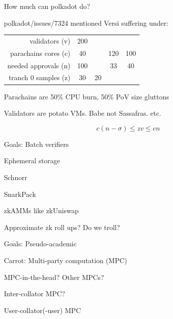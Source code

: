 \documentclass{beamer}
\begin{document}
\begin{frame}{How much can polkadot do?}

polkadot/issues/7324 mentioned Versi suffering under: \\ \medskip

\begin{tabular}{r c c c c}
validators (v)       & 200 & & \\
parachains cores (c) & 40  & & 120 & 100 \\
needed approvals (n) & 100 & & 33 & 40 \\
tranch 0 samples (z) & 30  & 20 & \\ %
\end{tabular}

\medskip 

Parachains are 50\% CPU burn, 50\% PoV size gluttons
 
Validators are potato VMs.  Babe not Sassafras.  etc.

$$ c (n - \sigma) \le z v \le c n  $$

\end{frame}

    
\begin{frame}{Goals: Batch verifiers}

Ephemeral storage \\ \bigskip

Schnorr \\ \bigskip

SnarkPack \\ \bigskip

zkAMMs like zkUniswap  \\ \bigskip

\hspace{10pt} Approximate zk roll ups?  Do we troll? \\ \bigskip

\end{frame}


\begin{frame}{Goals: Pseudo-academic}

Carrot: Multi-party computation (MPC) \\ \bigskip

MPC-in-the-head? Other MPCs? \\ \bigskip\bigskip

Inter-collator MPC? \\ \bigskip

User-collator(-user) MPC \\ \bigskip

\end{frame}
\end{document}
